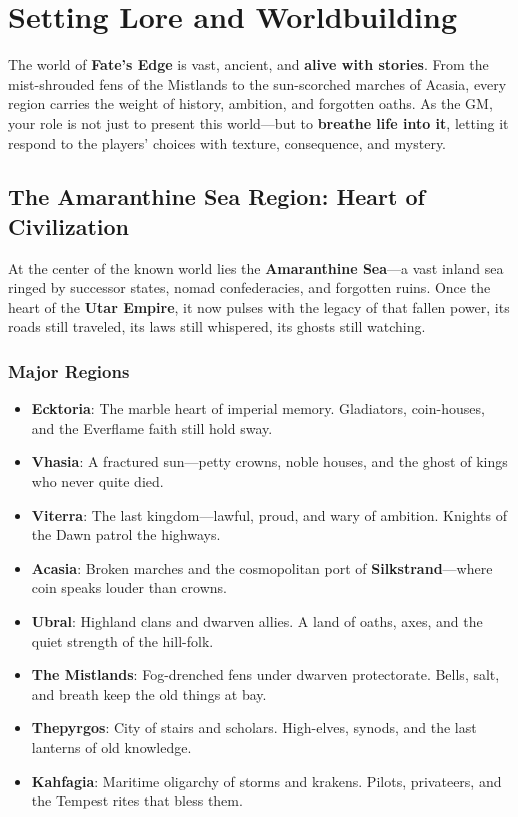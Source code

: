 \chapter{Setting Lore and Worldbuilding}

The world of \textbf{Fate’s Edge} is vast, ancient, and \textbf{alive with stories}. From the mist-shrouded fens of the Mistlands to the sun-scorched marches of Acasia, every region carries the weight of history, ambition, and forgotten oaths. As the GM, your role is not just to present this world—but to \textbf{breathe life into it}, letting it respond to the players’ choices with texture, consequence, and mystery.

\section*{The Amaranthine Sea Region: Heart of Civilization}

At the center of the known world lies the \textbf{Amaranthine Sea}—a vast inland sea ringed by successor states, nomad confederacies, and forgotten ruins. Once the heart of the \textbf{Utar Empire}, it now pulses with the legacy of that fallen power, its roads still traveled, its laws still whispered, its ghosts still watching.

\subsection*{Major Regions}

\begin{itemize}
    \item \textbf{Ecktoria}: The marble heart of imperial memory. Gladiators, coin-houses, and the Everflame faith still hold sway.
    \item \textbf{Vhasia}: A fractured sun—petty crowns, noble houses, and the ghost of kings who never quite died.
    \item \textbf{Viterra}: The last kingdom—lawful, proud, and wary of ambition. Knights of the Dawn patrol the highways.
    \item \textbf{Acasia}: Broken marches and the cosmopolitan port of \textbf{Silkstrand}—where coin speaks louder than crowns.
    \item \textbf{Ubral}: Highland clans and dwarven allies. A land of oaths, axes, and the quiet strength of the hill-folk.
    \item \textbf{The Mistlands}: Fog-drenched fens under dwarven protectorate. Bells, salt, and breath keep the old things at bay.
    \item \textbf{Thepyrgos}: City of stairs and scholars. High-elves, synods, and the last lanterns of old knowledge.
    \item \textbf{Kahfagia}: Maritime oligarchy of storms and krakens. Pilots, privateers, and the Tempest rites that bless them.
\end{itemize}


